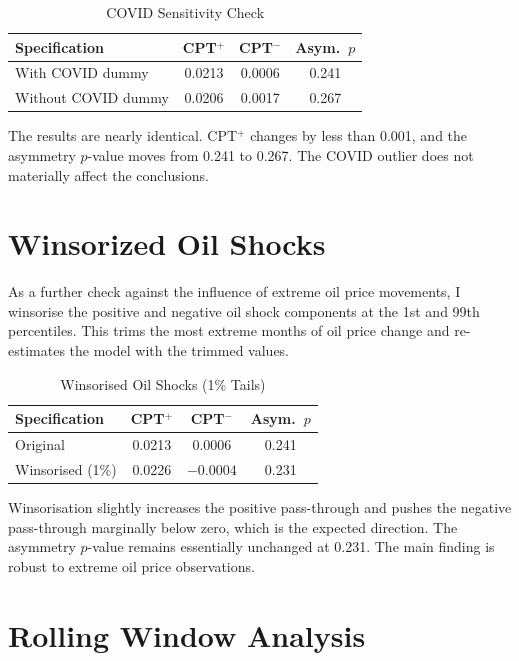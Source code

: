\begin{table}[H]
\centering
\caption{COVID Sensitivity Check}
\label{tab:covid}
\begin{tabular}{lccc}
\toprule
\textbf{Specification} & \textbf{CPT$^+$} & \textbf{CPT$^-$} & \textbf{Asym.\ $p$} \\
\midrule
With COVID dummy & 0.0213 & 0.0006 & 0.241 \\
Without COVID dummy & 0.0206 & 0.0017 & 0.267 \\
\bottomrule
\end{tabular}
\end{table}

The results are nearly identical. CPT$^+$ changes by less than 0.001, and the asymmetry $p$-value moves from 0.241 to 0.267. The COVID outlier does not materially affect the conclusions.

\section{Winsorized Oil Shocks}

As a further check against the influence of extreme oil price movements, I winsorise the positive and negative oil shock components at the 1st and 99th percentiles. This trims the most extreme months of oil price change and re-estimates the model with the trimmed values.

\begin{table}[H]
\centering
\caption{Winsorised Oil Shocks (1\% Tails)}
\label{tab:winsor}
\begin{tabular}{lccc}
\toprule
\textbf{Specification} & \textbf{CPT$^+$} & \textbf{CPT$^-$} & \textbf{Asym.\ $p$} \\
\midrule
Original & 0.0213 & 0.0006 & 0.241 \\
Winsorised (1\%) & 0.0226 & $-0.0004$ & 0.231 \\
\bottomrule
\end{tabular}
\end{table}

Winsorisation slightly increases the positive pass-through and pushes the negative pass-through marginally below zero, which is the expected direction. The asymmetry $p$-value remains essentially unchanged at 0.231. The main finding is robust to extreme oil price observations.

\section{Rolling Window Analysis}

